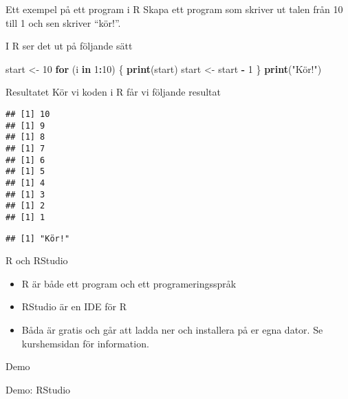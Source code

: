 \documentclass[
  10pt,
  ignorenonframetext,
]{beamer}
\newenvironment{Shaded}{\begin{snugshade}}{\end{snugshade}}
\newcommand{\ControlFlowTok}[1]{\textcolor[rgb]{0.13,0.29,0.53}{\textbf{#1}}}
\newcommand{\DecValTok}[1]{\textcolor[rgb]{0.00,0.00,0.81}{#1}}
\newcommand{\FunctionTok}[1]{\textcolor[rgb]{0.13,0.29,0.53}{\textbf{#1}}}
\newcommand{\NormalTok}[1]{#1}
\newcommand{\OtherTok}[1]{\textcolor[rgb]{0.56,0.35,0.01}{#1}}
\newcommand{\SpecialCharTok}[1]{\textcolor[rgb]{0.81,0.36,0.00}{\textbf{#1}}}
\newcommand{\StringTok}[1]{\textcolor[rgb]{0.31,0.60,0.02}{#1}}
\providecommand{\tightlist}{%
  \setlength{\itemsep}{0pt}\setlength{\parskip}{0pt}}
\begin{document}
\begin{frame}[fragile]{Ett exempel på ett program i R}
\protect\hypertarget{ett-exempel-puxe5-ett-program-i-r}{}
Skapa ett program som skriver ut talen från 10 till 1 och sen skriver
``kör!''.

\pause

I R ser det ut på följande sätt

\begin{Shaded}
\begin{Highlighting}[]
\NormalTok{start }\OtherTok{\textless{}{-}} \DecValTok{10}
\ControlFlowTok{for}\NormalTok{ (i }\ControlFlowTok{in} \DecValTok{1}\SpecialCharTok{:}\DecValTok{10}\NormalTok{) \{}
  \FunctionTok{print}\NormalTok{(start)}
\NormalTok{  start }\OtherTok{\textless{}{-}}\NormalTok{ start }\SpecialCharTok{{-}} \DecValTok{1}
\NormalTok{\}}
\FunctionTok{print}\NormalTok{(}\StringTok{"Kör!"}\NormalTok{)}
\end{Highlighting}
\end{Shaded}
\end{frame}

\begin{frame}[fragile]{Resultatet}
\protect\hypertarget{resultatet}{}
Kör vi koden i R får vi följande resultat

\begin{verbatim}
## [1] 10
## [1] 9
## [1] 8
## [1] 7
## [1] 6
## [1] 5
## [1] 4
## [1] 3
## [1] 2
## [1] 1
\end{verbatim}

\begin{verbatim}
## [1] "Kör!"
\end{verbatim}
\end{frame}

\begin{frame}{R och RStudio}
\protect\hypertarget{r-och-RStudio}{}
\begin{itemize}
\tightlist
\item
  R är både ett program och ett programeringsspråk
\item
  RStudio är en IDE för R
\item
  Båda är gratis och går att ladda ner och installera på er egna dator.
  Se kurshemsidan för information.
\end{itemize}
\end{frame}

\begin{frame}{Demo}
\protect\hypertarget{demo}{}
\begin{block}{Demo: RStudio}
\protect\hypertarget{demo-RStudio}{}
\end{block}
\end{frame}
\end{document}
